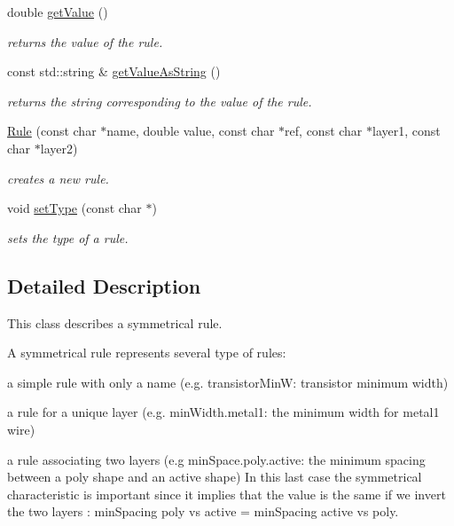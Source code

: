 \begin{DoxyCompactItemize}
double \mbox{\hyperlink{class_d_t_r_1_1_rule_a666f992950731c68de1ad441f80f228c}{get\+Value}} ()
\begin{DoxyCompactList}\small\item\em returns the value of the rule. \end{DoxyCompactList}\item 
\mbox{\label{class_d_t_r_1_1_rule_a3fad3e4886891e1efcdca530d2f6daa3}} 
const std\+::string \& \mbox{\hyperlink{class_d_t_r_1_1_rule_a3fad3e4886891e1efcdca530d2f6daa3}{get\+Value\+As\+String}} ()
\begin{DoxyCompactList}\small\item\em returns the string corresponding to the value of the rule. \end{DoxyCompactList}\item 
\mbox{\hyperlink{class_d_t_r_1_1_rule_aee8c5385eba121203f788a012b502e24}{Rule}} (const char $\ast$name, double value, const char $\ast$ref, const char $\ast$layer1, const char $\ast$layer2)
\begin{DoxyCompactList}\small\item\em creates a new rule. \end{DoxyCompactList}\item 
void \mbox{\hyperlink{class_d_t_r_1_1_rule_a3568407d7a7890c39b8c9acc1e608535}{set\+Type}} (const char $\ast$)
\begin{DoxyCompactList}\small\item\em sets the type of a rule. \end{DoxyCompactList}\end{DoxyCompactItemize}


\subsection{Detailed Description}
This class describes a symmetrical rule.

A symmetrical rule represents several type of rules\+:
\begin{DoxyItemize}
\item a simple rule with only a name (e.\+g. transistor\+MinW\+: transistor minimum width)
\item a rule for a unique layer (e.\+g. min\+Width.\+metal1\+: the minimum width for metal1 wire)
\item a rule associating two layers (e.\+g min\+Space.\+poly.\+active\+: the minimum spacing between a poly shape and an active shape) In this last case the symmetrical characteristic is important since it implies that the value is the same if we invert the two layers \+: min\+Spacing poly vs active = min\+Spacing active vs poly.
\end{DoxyItemize}

